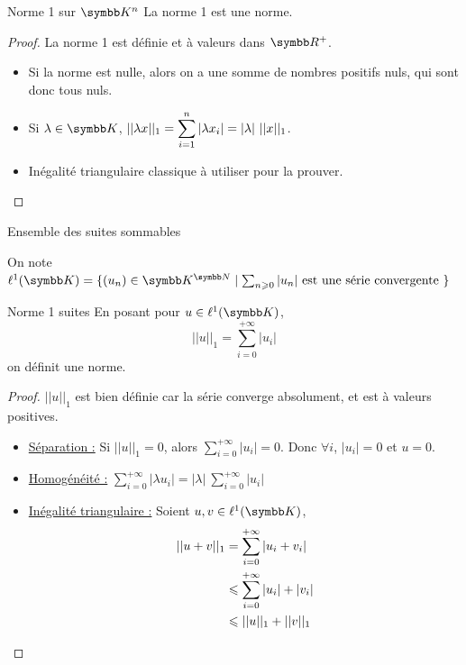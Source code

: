 \begin{theoreme}{Norme 1 sur $\K^n$}{}
    La norme 1 est une norme.
\end{theoreme}

\begin{proof}
    La norme 1 est définie et à valeurs dans $\R^+$. 

    \begin{itemize}
        \item Si la norme est nulle, alors on a une somme de nombres positifs nuls, qui sont donc tous nuls. 
        \item Si $\lambda \in \K$, $\displaystyle ||\lambda x ||_1 = \sum_{i = 1}^n|\lambda x_i | = |\lambda| ~ ||x||_1$.
        \item  Inégalité triangulaire classique à utiliser pour la prouver. 
    \end{itemize}
\end{proof}

\begin{definition}{Ensemble des suites sommables}{}

    On note $\ell^1(\K) = \{(u_n) \in \K^{\N} \mid \sum_{n \geqslant 0} |u_n| ~ \text{est une série convergente} ~ \}$
\end{definition}

\begin{theoreme}{Norme 1 suites}{}
    En posant pour $u \in \ell^1(\K)$,
    \[||u||_1 = \sum_{i = 0}^{+ \infty }|u_i|\] 
    on définit une norme. 
\end{theoreme}

\begin{proof}
    $|| u ||_1$ est bien définie car la série converge absolument, et est à valeurs positives.

    \begin{itemize}
        \item \uline{Séparation :}
        Si $||u ||_1 = 0$, alors $\displaystyle \sum_{i = 0}^{+ \infty}  |u_i| = 0 $.
        Donc $\forall i$, $|u_i| = 0 $ et $u = 0$. 

        \item \uline{Homogénéité :}
        $\displaystyle \sum_{ i = 0 }^{+ \infty } |\lambda u_i| = |\lambda| ~ \sum_{i = 0 }^{+ \infty } |u_i|$
        
        \item \uline{Inégalité triangulaire :} Soient $u, v \in \ell^1(\K)$,
        \[ \displaystyle
            \begin{aligned}
                ||u + v ||_1 & =  \sum_{i = 0 }^{+ \infty } |u_i + v_i| \\
                \space & \leqslant  \sum_{i = 0}^{+ \infty} |u_i| + |v_i| \\
                \space & \leqslant  ||u||_1 + ||v||_1 \\
            \end{aligned}
        \]
    \end{itemize}
\end{proof}

